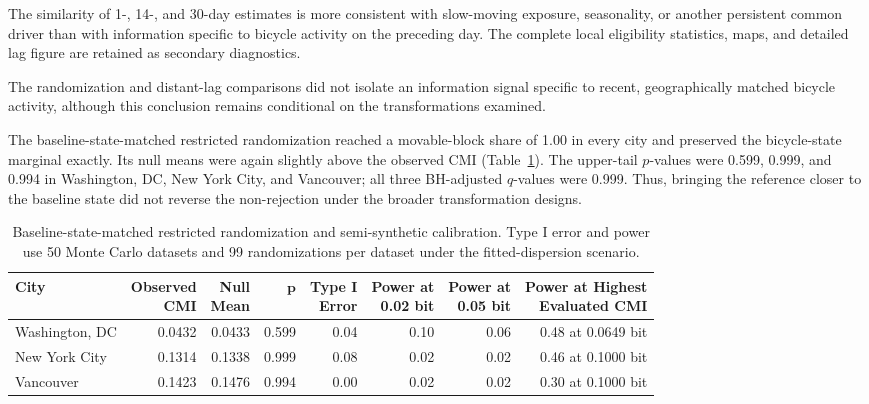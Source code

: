 \documentclass[applsci,article,accept,moreauthors]{Definitions/mdpi}
\def\colorbox#1#2{#2}%
\begin{document}
{The similarity of 1-, 14-, and 30-day estimates is more consistent
with slow-moving exposure, seasonality, or another persistent common driver
than with information specific to bicycle activity on the preceding day.}
{The complete local eligibility statistics, maps, and detailed lag figure
are retained as secondary diagnostics.}

The randomization and distant-lag comparisons did not isolate an information
signal specific to recent, geographically matched bicycle activity, although
this conclusion remains conditional on the transformations examined.

The baseline-state-matched restricted randomization reached a movable-block
share of 1.00 in every city and preserved the bicycle-state marginal
exactly. Its null means were again slightly above the observed CMI
(\colorbox{green}{Table}~\ref{tab:e18_restricted_calibration}). The upper-tail \(p\)-values
were 0.599, 0.999, and 0.994 in Washington, DC, New York City, and
Vancouver; all three BH-adjusted \(q\)-values were 0.999. Thus, bringing
the reference closer to the baseline state did not reverse the
non-rejection under the broader transformation designs.

\begin{table}[H]
\caption{Baseline-state-matched restricted randomization and semi-synthetic
calibration. Type I error and power use 50 Monte Carlo datasets and 99
randomizations per dataset under the fitted-dispersion scenario.}
\label{tab:e18_restricted_calibration}
\centering
\setlength{\tabcolsep}{2.5pt}
\begin{tabular*}{\textwidth}{@{\extracolsep{\fill}}lrrrrrrr@{}}
\toprule
\textbf{City} & \shortstack{\textbf{Observed}\\\textbf{CMI}} &
\shortstack{\textbf{Null}\\\textbf{Mean}} &
\textbf{\(\boldsymbol{p}\)} & \shortstack{\textbf{Type I}\\\textbf{Error}} &
\shortstack{\textbf{Power at}\\\textbf{0.02 bit}} &
\shortstack{\textbf{Power at}\\\textbf{0.05 bit}} &
\shortstack{\textbf{Power at Highest}\\\textbf{Evaluated CMI}}\\
\midrule
Washington, DC & 0.0432 & 0.0433 & 0.599 & 0.04 & 0.10 & 0.06 &
0.48 at 0.0649 bit\\
New York City & 0.1314 & 0.1338 & 0.999 & 0.08 & 0.02 & 0.02 &
0.46 at 0.1000 bit\\
Vancouver & 0.1423 & 0.1476 & 0.994 & 0.00 & 0.02 & 0.02 &
0.30 at 0.1000 bit\\
\bottomrule
\end{tabular*}
\end{table}
\end{document}
